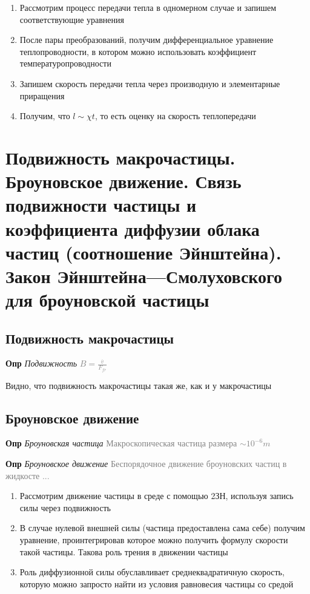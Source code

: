 \documentclass[a4paper, 14pt]{article}
\begin{document}
    \begin{enumerate}
        \item Рассмотрим процесс передачи тепла в одномерном случае и запишем соответствующие уравнения
        \item После пары преобразований, получим дифференциальное уравнение теплопроводности, в котором можно
        использовать коэффициент температуропроводности
        \item Запишем скорость передачи тепла через производную и элементарные приращения
        \item Получим, что $l \sim \chi t$, то есть оценку на скорость теплопередачи
    \end{enumerate}
    
    \section{Подвижность макрочастицы.
    Броуновское движение.
    Связь подвижности частицы и коэффициента диффузии облака частиц (соотношение Эйнштейна).
    Закон Эйнштейна—Смолуховского для броуновской частицы}
    
    \subsection{Подвижность макрочастицы}
    
    \textbf{Опр} \textit{Подвижность} \textcolor{gray}{$B = \frac{\overline{v}}{F_{fr}}$}
    
    Видно, что подвижность макрочастицы такая же, как и у макрочастицы
    
    \subsection{Броуновское движение}
    
    \textbf{Опр} \textit{Броуновская частица} \textcolor{gray}{Макроскопическая частица размера $\sim 10^{-6} m$}
    
    \textbf{Опр} \textit{Броуновское движение} \textcolor{gray}{Беспорядочное движение броуновских частиц в жидкосте ...}
    
    \begin{enumerate}
        \item Рассмотрим движение частицы в среде с помощью 2ЗН, используя запись силы через подвижность
        \item В случае нулевой внешней силы (частица предоставлена сама себе) получим уравнение, проинтегрировав
        которое можно получить формулу скорости такой частицы.
        Такова роль трения в движении частицы
        \item Роль диффузионной силы обуславливает среднеквадратичную скорость, которую можно запросто найти из условия
        равновесия частицы со средой
    \end{enumerate}
    
\end{document}
